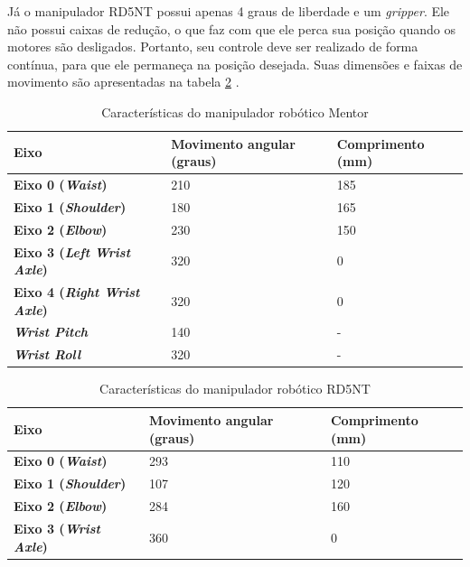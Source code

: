 Já o manipulador RD5NT possui apenas 4 graus de liberdade e um \textit{gripper}.
Ele não possui caixas de redução, o que faz com que ele perca sua posição quando os motores são desligados.
Portanto, seu controle deve ser realizado de forma contínua, para que ele permaneça na posição desejada.
Suas dimensões e faixas de movimento são apresentadas na tabela \ref{tab:caracteristicasManipuladorRD5NT} \cite{controle_neural_robo}.

\begin{table}
    \centering
    \caption{Características do manipulador robótico Mentor}
    \label{tab:caracteristicasManipuladorMentor}
    \begin{tabular}{|l|l|l|}
        \hline
        \textbf{Eixo} & \textbf{Movimento angular (graus)} & \textbf{Comprimento (mm)} \\ \hline
        \textbf{Eixo 0 (\textit{Waist})}            & 210 & 185 \\ \hline
        \textbf{Eixo 1 (\textit{Shoulder})}         & 180 & 165 \\ \hline
        \textbf{Eixo 2 (\textit{Elbow})}            & 230 & 150 \\ \hline
        \textbf{Eixo 3 (\textit{Left Wrist Axle})}  & 320 & 0 \\ \hline
        \textbf{Eixo 4 (\textit{Right Wrist Axle})} & 320 & 0 \\ \hline
        \textbf{\textit{Wrist Pitch}}               & 140 & - \\ \hline
        \textbf{\textit{Wrist Roll}}                & 320 & - \\ \hline
    \end{tabular}
\end{table}

\begin{table}
    \centering
    \caption{Características do manipulador robótico RD5NT}
    \label{tab:caracteristicasManipuladorRD5NT}
    \begin{tabular}{|l|l|l|}
        \hline
        \textbf{Eixo} & \textbf{Movimento angular (graus)} & \textbf{Comprimento (mm)} \\ \hline
        \textbf{Eixo 0 (\textit{Waist})}            & 293 & 110 \\ \hline
        \textbf{Eixo 1 (\textit{Shoulder})}         & 107 & 120 \\ \hline
        \textbf{Eixo 2 (\textit{Elbow})}            & 284 & 160 \\ \hline
        \textbf{Eixo 3 (\textit{Wrist Axle})}       & 360 & 0 \\ \hline
    \end{tabular}
\end{table}


